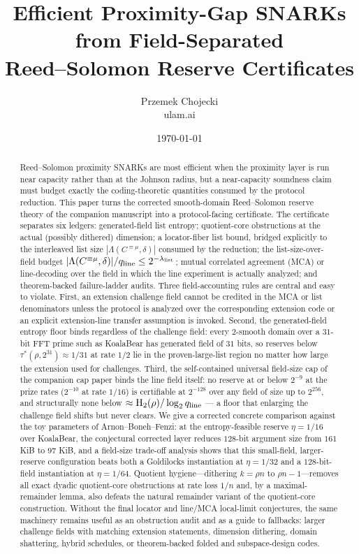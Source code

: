 \documentclass[11pt]{article}
\title{Efficient Proximity-Gap SNARKs from Field-Separated\\ Reed--Solomon Reserve Certificates}
\author{Przemek Chojecki\\ \small ulam.ai}
\date{\today}
\theoremstyle{definition}
\newcommand{\Hbin}{\operatorname{H}_2}
\newcommand{\taustar}{\tau^{*}}
\newcommand{\qline}{q_{\rm line}}
\newcommand{\Int}[2]{#1^{\equiv #2}}
\begin{document}
\maketitle

\begin{abstract}
Reed--Solomon proximity SNARKs are most efficient when the proximity layer is run near capacity rather than at the Johnson radius, but a near-capacity soundness claim must budget exactly the coding-theoretic quantities consumed by the protocol reduction.  This paper turns the corrected smooth-domain Reed--Solomon reserve theory of the companion manuscript into a protocol-facing certificate.  The certificate separates six ledgers: generated-field list entropy; quotient-core obstructions at the actual (possibly dithered) dimension; a locator-fiber list bound, bridged explicitly to the interleaved list size $|\Lambda(\Int{C}{\mu},\delta)|$ consumed by the reduction; the list-size-over-field budget $|\Lambda(\Int{C}{\mu},\delta)|/\qline\le2^{-\lambda_{\rm list}}$; mutual correlated agreement (MCA) or line-decoding over the field in which the line experiment is actually analyzed; and theorem-backed failure-ladder audits.  Three field-accounting rules are central and easy to violate.  First, an extension challenge field cannot be credited in the MCA or list denominators unless the protocol is analyzed over the corresponding extension code or an explicit extension-line transfer assumption is invoked.  Second, the generated-field entropy floor binds regardless of the challenge field: every $2$-smooth domain over a $31$-bit FFT prime such as KoalaBear has generated field of $31$ bits, so reserves below $\taustar(\rho,2^{31})\approx1/31$ at rate $1/2$ lie in the proven-large-list region no matter how large the extension used for challenges.  Third, the self-contained universal field-size cap of the companion cap paper binds the line field itself: no reserve at or below $2^{-9}$ at the prize rates ($2^{-10}$ at rate $1/16$) is certifiable at $2^{-128}$ over any field of size up to $2^{256}$, and structurally none below $\approx\Hbin(\rho)/\log_2\qline$ --- a floor that enlarging the challenge field shifts but never clears.  We give a corrected concrete comparison against the toy parameters of Arnon--Boneh--Fenzi: at the entropy-feasible reserve $\eta=1/16$ over KoalaBear, the conjectural corrected layer reduces $128$-bit argument size from $161$ KiB to $97$ KiB, and a field-size trade-off analysis shows that this small-field, larger-reserve configuration beats both a Goldilocks instantiation at $\eta=1/32$ and a $128$-bit-field instantiation at $\eta=1/64$.  Quotient hygiene---dithering $k=\rho n$ to $\rho n-1$---removes all exact dyadic quotient-core obstructions at rate loss $1/n$ and, by a maximal-remainder lemma, also defeats the natural remainder variant of the quotient-core construction.  Without the final locator and line/MCA local-limit conjectures, the same machinery remains useful as an obstruction audit and as a guide to fallbacks: larger challenge fields with matching extension statements, dimension dithering, domain shattering, hybrid schedules, or theorem-backed folded and subspace-design codes.


\end{abstract}
\end{document}
